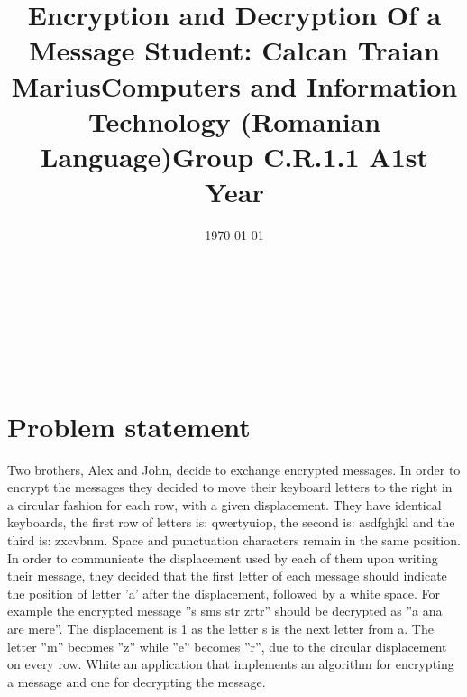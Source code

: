 \documentclass[14pt]{article}
\begin{document}
\title{\huge Encryption and Decryption Of a Message }
\date{\today}
\maketitle
\begin{center}
\vspace{30 mm}

\title{\huge Student: Calcan Traian Marius}
\\\vspace{10 mm}
\title{\huge Computers and Information Technology (Romanian Language)}
\\\vspace{10 mm}
\title{\huge Group C.R.1.1 A}
\\\vspace{10 mm}
\title{\huge 1st Year}
\date{}
\maketitle

\newpage

\section*{Problem statement}
\end{center}
Two brothers, Alex and John, decide to exchange encrypted messages. In order
to encrypt the messages they decided to move their keyboard letters to the right
in a circular fashion for each row, with a given displacement. They have identical
keyboards, the first row of letters is: qwertyuiop, the second is: asdfghjkl and the
third is: zxcvbnm. Space and punctuation characters remain in the same position.
In order to communicate the displacement used by each of them upon writing
their message, they decided that the first letter of each message should indicate
the position of letter ’a’ after the displacement, followed by a white space. For
example the encrypted message ”s sms str zrtr” should be decrypted as ”a ana are
mere”. The displacement is 1 as the letter s is the next letter from a. The letter
”m” becomes ”z” while ”e” becomes ”r”, due to the circular displacement on
every row. White an application that implements an algorithm for encrypting a
message and one for decrypting the message.


\newpage
\end{document}
